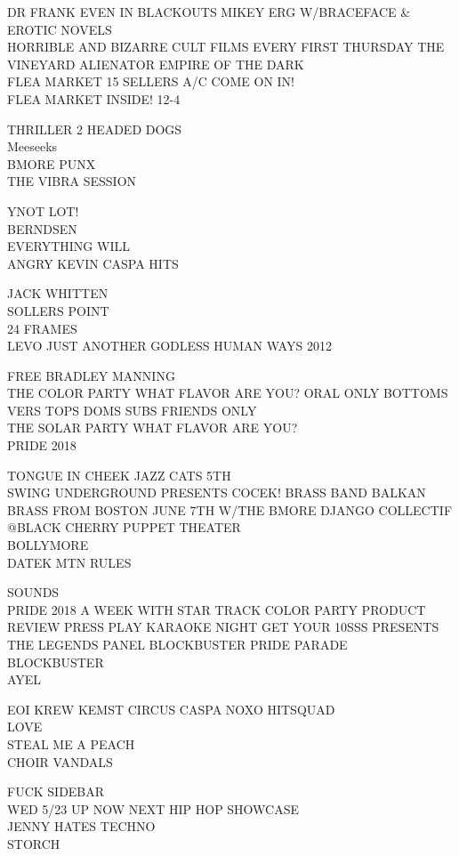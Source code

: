 \documentclass[10pt,letterpaper]{article}
\begin{document}
DR FRANK EVEN IN BLACKOUTS MIKEY ERG W/BRACEFACE \& EROTIC NOVELS\\
HORRIBLE AND BIZARRE CULT FILMS EVERY FIRST THURSDAY THE VINEYARD ALIENATOR EMPIRE OF THE DARK\\
FLEA MARKET 15 SELLERS A/C COME ON IN!\\
FLEA MARKET INSIDE! 12{-}4

THRILLER 2 HEADED DOGS\\
Meeseeks\\
BMORE PUNX\\
THE VIBRA SESSION

YNOT LOT!\\
BERNDSEN\\
EVERYTHING WILL\\
ANGRY KEVIN CASPA HITS

JACK WHITTEN\\
SOLLERS POINT\\
24 FRAMES\\
LEVO JUST ANOTHER GODLESS HUMAN WAYS 2012

FREE BRADLEY MANNING\\
THE COLOR PARTY WHAT FLAVOR ARE YOU?  ORAL ONLY BOTTOMS VERS TOPS DOMS SUBS FRIENDS ONLY\\
THE SOLAR PARTY WHAT FLAVOR ARE YOU?\\
PRIDE 2018

TONGUE IN CHEEK JAZZ CATS 5TH\\
SWING UNDERGROUND PRESENTS COCEK!  BRASS BAND BALKAN BRASS FROM BOSTON JUNE 7TH W/THE BMORE DJANGO COLLECTIF @BLACK CHERRY PUPPET THEATER\\
BOLLYMORE\\
DATEK MTN RULES

SOUNDS\\
PRIDE 2018 A WEEK WITH STAR TRACK COLOR PARTY PRODUCT REVIEW PRESS PLAY KARAOKE NIGHT GET YOUR 10SSS PRESENTS THE LEGENDS PANEL BLOCKBUSTER PRIDE PARADE\\
BLOCKBUSTER\\
AYEL

EOI KREW KEMST CIRCUS CASPA NOXO HITSQUAD\\
LOVE\\
STEAL ME A PEACH\\
CHOIR VANDALS

FUCK SIDEBAR\\
WED 5/23 UP NOW NEXT HIP HOP SHOWCASE\\
JENNY HATES TECHNO\\
STORCH
\end{document}
